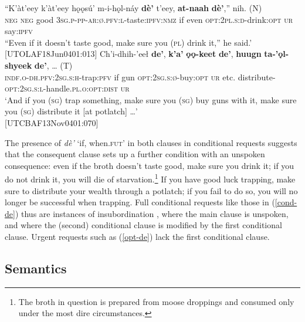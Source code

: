 \documentclass[output=paper,colorlinks,citecolor=brown]{langscibook}
\begin{document}
\begin{exe}
\ex \label{cond-de}
\begin{xlista}
\ex \label{cond-dea}
\gll ``K'àt'eey k'àt'eey hǫǫsú' m-i-hǫl-náy \textbf{dè'} t'eey, \textbf{at-naah} \textbf{dè'},'' nih. \textnormal{(N)} \\
\textsc{neg} \textsc{neg} good \textsc{3sg.p-pp-ar:ø.pfv:l}-taste:\textsc{ipfv:nmz} if even \textsc{opt:2pl.s:d}-drink:\textsc{opt} \textsc{ur} say:\textsc{ipfv} \\
``Even if it doesn't taste good, make sure you (\textsc{pl}) drink it,'' he said.' \\ \hfill [UTOLAF18Jun0401:013]
\ex\label{cond-deb}
\gll Ch'i-dhih-'eeł \textbf{de'}, \textbf{k'a'} \textbf{ǫǫ-keet} \textbf{de'}, \textbf{huugn} \textbf{ta-'ǫl-shyeek} \textbf{de'},  {\ldots} \textnormal{(T)} \\
\textsc{indf.o-dh.pfv:2sg.s:h}-trap:\textsc{pfv} if gun \textsc{opt:2sg.s:ø}-buy:\textsc{opt} \textsc{ur} etc. distribute-\textsc{opt:2sg.s:l}-handle.\textsc{pl.o:opt:dist} \textsc{ur} \\
\glt `And if you (\textsc{sg}) trap something, make sure you (\textsc{sg}) buy guns with it, make sure you (\textsc{sg}) distribute it [at potlatch] \ldots' \\ \hfill [UTCBAF13Nov0401:070]
\end{xlista}
\end{exe}

\noindent The presence of \textit{dè'} `if, when.\textsc{fut}' in both clauses in conditional requests suggests that the consequent clause sets up a further condition with an unspoken consequence: even if the broth doesn't taste good, make sure you drink it; if you do not drink it, you will  die of starvation.\footnote{The broth in question is prepared from moose droppings and consumed only under the most dire circumstances.} If you have good luck trapping, make sure to distribute your wealth through a potlatch; if you fail to do so, you will no longer be successful when trapping. Full conditional requests like those in (\ref{cond-de}) thus are instances of insubordination \citep{evans2007}, where the main clause is unspoken, and where the (second) conditional clause is modified by the first conditional clause. Urgent requests such as (\ref{opt-de}) lack the first conditional clause. 

\subsection{Semantics}
\largerpage
\label{subsection:urgent-semantics}
\end{document}
